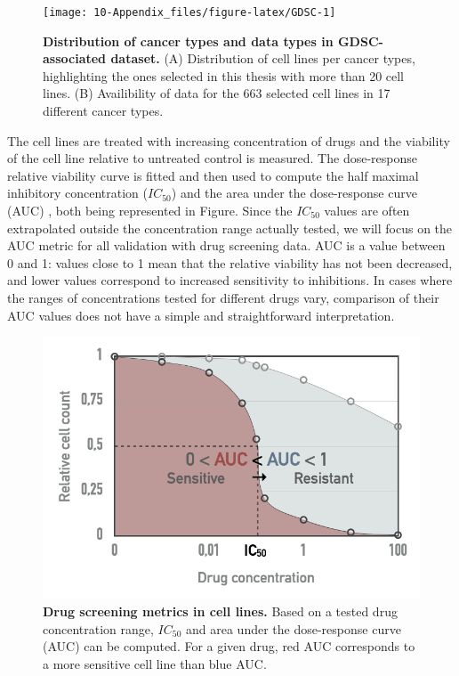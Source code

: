 \documentclass[a4paper,12pt,twoside,onecolumn,openright,final,oldfontcommands]{memoir}
\begin{document}
\begin{figure}

{\centering \texttt{[image: 10-Appendix\_files/figure-latex/GDSC-1]} 

}

\caption[Distribution of cancer types and data types in GDSC-associated dataset]{\textbf{Distribution of cancer types and data types
in GDSC-associated dataset.} (A) Distribution of cell lines per cancer
types, highlighting the ones selected in this thesis with more than 20
cell lines. (B) Availibility of data for the 663 selected cell lines in
17 different cancer types.}\label{fig:GDSC}
\end{figure}







The cell lines are treated with increasing concentration of drugs and
the viability of the cell line relative to untreated control is
measured. The dose-response relative viability curve is fitted and then
used to compute the half maximal inhibitory concentration (\(IC_{50}\))
and the area under the dose-response curve (AUC)
\citep{vis2016multilevel}, both being represented in Figure. Since the
\(IC_{50}\) values are often extrapolated outside the concentration
range actually tested, we will focus on the AUC metric for all
validation with drug screening data. AUC is a value between 0 and 1:
values close to 1 mean that the relative viability has not been
decreased, and lower values correspond to increased sensitivity to
inhibitions. In cases where the ranges of concentrations tested for
different drugs vary, comparison of their AUC values does not have a
simple and straightforward interpretation.

\begin{figure}

{\centering \includegraphics[width=0.5\linewidth]{fig/AUC} 

}

\caption[Drug screening metrics in cell lines]{\textbf{Drug screening metrics in cell lines.} Based
on a tested drug concentration range, \(IC_{50}\) and area under the
dose-response curve (AUC) can be computed. For a given drug, red AUC
corresponds to a more sensitive cell line than blue AUC.}\label{fig:AUC}
\end{figure}
\end{document}
